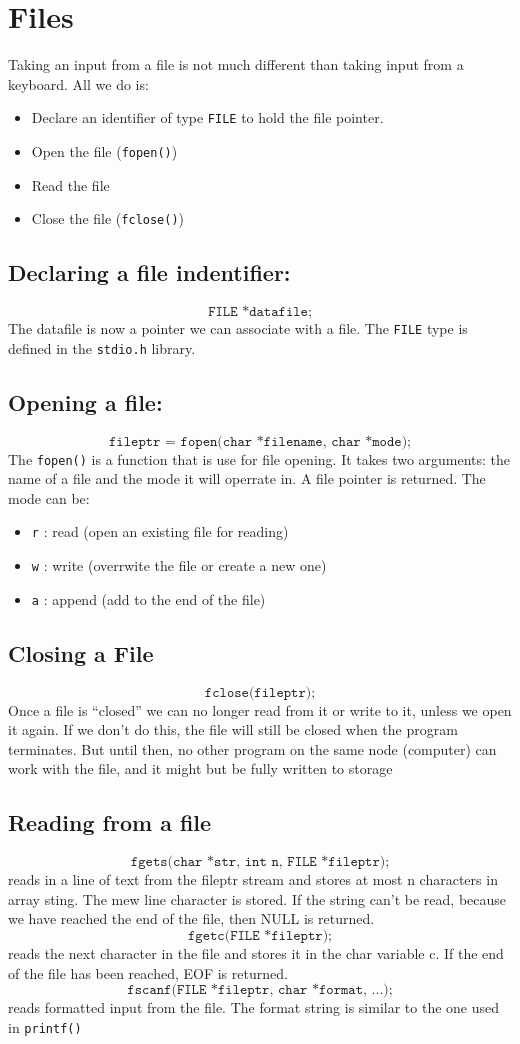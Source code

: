 \documentclass[a4paper, 10pt]{article}
\begin{document}
\section{Files}
Taking an input from a file is not much different than taking input from a keyboard. All we do is:
\begin{itemize}
    \item Declare an identifier of type \texttt{FILE} to hold the file pointer.
    \item Open the file (\texttt{fopen()})
    \item Read the file
    \item Close the file (\texttt{fclose()})
\end{itemize}
\subsection{Declaring a file indentifier:}
$$\texttt{FILE *datafile;}$$
The datafile is now a pointer we can associate with a file. The \texttt{FILE} type is defined in the \texttt{stdio.h} library.
\subsection{Opening a file:}
$$\texttt{fileptr = fopen(char *filename, char *mode);}$$
The \texttt{fopen()} is a function that is use for file opening. It takes two arguments: the name of a file and the mode it will operrate in. A file pointer is returned. The mode can be:
\begin{itemize}
    \item \texttt{r} : read (open an existing file for reading)
    \item \texttt{w} : write (overrwite the file or create a new one)
    \item \texttt{a} : append (add to the end of the file)
\end{itemize}
\subsection{Closing a File}
$$\texttt{fclose(fileptr);}$$
Once a file is “closed” we can no longer read from it or write to it, unless
we open it again. If we don’t do this, the file will still be closed when the
program terminates. But until then, no other program on the same node
(computer) can work with the file, and it might but be fully written to
storage
\subsection{Reading from a file}
$$\texttt{fgets(char *str, int n, FILE *fileptr);}$$
reads in a line of text from the fileptr stream and stores at most n
characters in array sting. The mew line character is stored.
If the string can’t be read, because we have reached the end of the file,
then NULL is returned.
$$\texttt{fgetc(FILE *fileptr);}$$
reads the next character in the file and stores it in the char variable c. If
the end of the file has been reached, EOF is returned.
$$\texttt{fscanf(FILE *fileptr, char *format, ...);}$$
reads formatted input from the file. The format string is similar to the
one used in \texttt{printf()}
\end{document}
